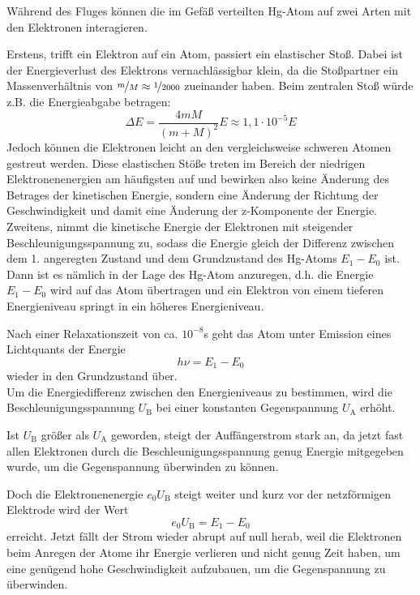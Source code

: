 \documentclass[titlepage = firstcover]{scrartcl}
\begin{document}
            Während des Fluges können die im Gefäß verteilten Hg-Atom auf zwei Arten mit den Elektronen interagieren.

            Erstens, trifft ein Elektron auf ein Atom, passiert ein elastischer Stoß. Dabei ist der Energieverlust des Elektrons vernachlässigbar klein, da die Stoßpartner ein Massenverhältnis von $\nicefrac{m}{M} \approx \nicefrac{1}{2000}$ zueinander haben. Beim zentralen Stoß würde z.B. die Energieabgabe betragen:
            \begin{equation*}
                \Delta E = \frac{4 m M}{(m + M)^2} E \approx 1,1 \cdot 10^{-5} E
            \end{equation*}
            Jedoch können die Elektronen leicht an den vergleichsweise schweren Atomen gestreut werden.
            Diese elastischen Stöße treten im Bereich der niedrigen Elektronenenergien am häufigsten auf und bewirken also keine Änderung des Betrages der kinetischen Energie, sondern eine Änderung der Richtung der Geschwindigkeit und damit eine Änderung der z-Komponente der Energie. \\

            Zweitens, nimmt die kinetische Energie der Elektronen mit steigender Beschleunigungsspannung zu, sodass die Energie gleich der Differenz zwischen dem 1. angeregten Zustand und dem Grundzustand des Hg-Atoms $E_1 - E_0$ ist.
            Dann ist es nämlich in der Lage des Hg-Atom anzuregen, d.h. die Energie $E_1 - E_0$ wird auf das Atom übertragen und ein Elektron von einem tieferen Energieniveau springt in ein höheres Energieniveau.

            Nach einer Relaxationszeit von ca. $10^ {-8}$s geht das Atom unter Emission eines Lichtquants der Energie
            \begin{equation*}
                h \nu = E_1 - E_0
            \end{equation*}
            wieder in den Grundzustand über.\\

            Um die Energiedifferenz zwischen den Energieniveaus zu bestimmen, wird die Beschleunigungsspannung $U_{\text{B}}$ bei einer konstanten Gegenspannung $U_{\text{A}}$ erhöht.

            Ist $U_{\text{B}}$ größer als $U_{\text{A}}$ geworden, steigt der Auffängerstrom stark an, da jetzt fast allen Elektronen durch die Beschleunigungsspannung genug Energie mitgegeben wurde, um die Gegenspannung überwinden zu können.

            Doch die Elektronenenergie $e_0 U_{\text{B}}$ steigt weiter und kurz vor der netzförmigen Elektrode wird der Wert
            \begin{equation}
                e_0 U_{\text{B}} = E_1 - E_0
                \label{eqn:spannung}
            \end{equation}
            erreicht.
            Jetzt fällt der Strom wieder abrupt auf null herab, weil die Elektronen beim Anregen der Atome ihr Energie verlieren und nicht genug Zeit haben, um eine genügend hohe Geschwindigkeit aufzubauen, um die Gegenspannung zu überwinden.
\end{document}
